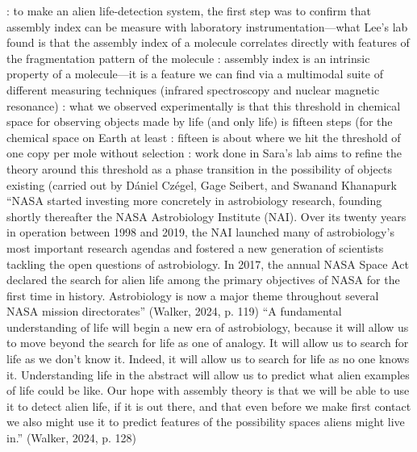 : to make an alien life-detection system, the first step was to confirm that assembly index can be measure with laboratory instrumentation—what Lee’s lab found is that the assembly index of a molecule correlates directly with features of the fragmentation pattern of the molecule\markdownRendererUlItemEnd 
{}: assembly index is an intrinsic property of a molecule—it is a feature we can find via a multimodal suite of different measuring techniques (infrared spectroscopy and nuclear magnetic resonance)\markdownRendererUlItemEnd 
{}: what we observed experimentally is that this threshold in chemical space for observing objects made by life (and only life) is fifteen steps (for the chemical space on Earth at least\markdownRendererUlItemEnd 
{}: fifteen is about where we hit the threshold of one copy per mole without selection\markdownRendererUlItemEnd 
{}: work done in Sara’s lab aims to refine the theory around this threshold as a phase transition in the possibility of objects existing (carried out by Dániel Czégel, Gage Seibert, and Swanand Khanapurk\markdownRendererUlItemEnd 
\markdownRendererUlEndTight \markdownRendererInterblockSeparator
{}\markdownRendererInterblockSeparator
{}\markdownRendererUlBeginTight
\markdownRendererUlItem “NASA started investing more concretely in astrobiology research, founding shortly thereafter the NASA Astrobiology Institute (NAI). Over its twenty years in operation between 1998 and 2019, the NAI launched many of astrobiology’s most important research agendas and fostered a new generation of scientists tackling the open questions of astrobiology. In 2017, the annual NASA Space Act declared the search for alien life among the primary objectives of NASA for the first time in history. Astrobiology is now a major theme throughout several NASA mission directorates” (Walker, 2024, p. 119)\markdownRendererUlItemEnd 
\markdownRendererUlItem “A fundamental understanding of life will begin a new era of astrobiology, because it will allow us to move beyond the search for life as one of analogy. It will allow us to search for life as we don’t know it. Indeed, it will allow us to search for life as no one knows it. Understanding life in the abstract will allow us to predict what alien examples of life could be like. Our hope with assembly theory is that we will be able to use it to detect alien life, if it is out there, and that even before we make first contact we also might use it to predict features of the possibility spaces aliens might live in.” (Walker, 2024, p. 128)\markdownRendererUlItemEnd 
